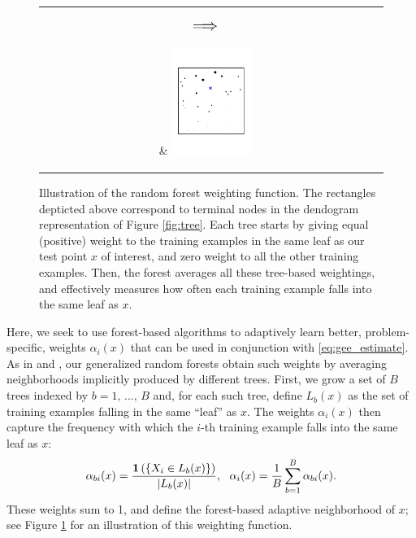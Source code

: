\documentclass[aos]{imsart}
\theoremstyle{plain}
\theoremstyle{definition}
\theoremstyle{remark}
\begin{document}
\begin{CJK}{UTF8}{gbsn}
\begin{figure}
\begin{center}
\begin{tabular}{cc}
\parbox[b][0.25\textwidth][c]{0.12\textwidth}{$$\mathlarger{\mathlarger{\Longrightarrow}}$$} &
\includegraphics[width = 0.25\textwidth, trim=15mm 40mm 20mm 40mm, clip = TRUE]{tree_match_ensemble.pdf}
\end{tabular}
\end{center}
\caption{Illustration of the random forest weighting function. The rectangles depticted above correspond
to terminal nodes in the dendogram representation of Figure \ref{fig:tree}. Each tree starts by giving equal
(positive) weight to the training examples in the same leaf as our test point $x$ of interest, and zero
weight to all the other training examples. Then, the forest averages all these tree-based weightings,
and effectively measures how often each training example falls into the same leaf as $x$.}
\label{fig:weighting}
\vspace{-1.5\baselineskip}
\end{figure}

Here, we seek to use forest-based algorithms to adaptively learn better, problem-specific,
weights $\alpha_i(x)$ that can be used in conjunction with \eqref{eq:gee_estimate}.
As in \citet{hothorn2004bagging} and \citet{meinshausen2006quantile}, our generalized random forests obtain such weights
by averaging neighborhoods implicitly produced by different trees. First, we grow a set of
$B$ trees indexed by $b = 1, \, ..., \, B$ and, for each such tree, define $L_b(x)$
as the set of training examples falling in the same ``leaf'' as $x$. The weights $\alpha_i(x)$ then
capture the frequency with which the $i$-th training example falls into the same leaf as $x$:
\begin{equation}
\label{eq:forest_weights}
\alpha_{bi}(x) = \frac{\1\p{\cb{X_i \in L_b(x)}}}{\abs{L_b(x)}}, \ \ \alpha_i(x) = \frac{1}{B} \sum_{b = 1}^B \alpha_{bi}(x).
\end{equation}
These weights sum to 1, and define the forest-based adaptive neighborhood of $x$; see Figure \ref{fig:weighting} for an illustration of this weighting function.


\end{CJK}
\end{document}
